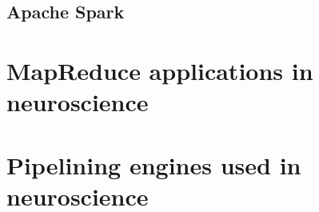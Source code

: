 \documentclass{report}
\begin{document}
\section{Apache Spark}
\cite{spark}
\chapter{MapReduce applications in neuroscience}
\cite{thunder}

\chapter{Pipelining engines used in neuroscience}
\cite{nipype}



\end{document}
